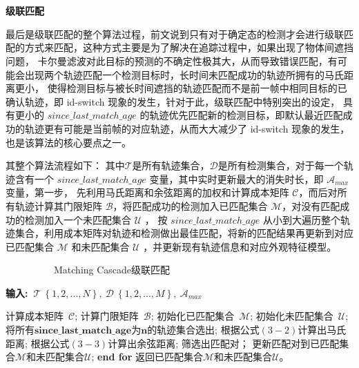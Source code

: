 \\ \hspace*{\fill} \\
\textbf{级联匹配}

最后是级联匹配的整个算法过程，前文说到只有对于确定态的检测才会进行级联匹配的方式来匹配，这种方式主要是为了解决在追踪过程中，如果出现了物体间遮挡问题，
卡尔曼滤波对此目标的预测的不确定性极其大，从而导致错误匹配，有可能会出现两个轨迹匹配一个检测目标时，长时间未匹配成功的轨迹所拥有的马氏距离更小，
使得检测目标与被长时间遮挡的轨迹匹配而不是前一帧中相同目标的已确认轨迹，即 id-switch 现象的发生，针对于此，级联匹配中特别突出的设定，
具有更小的 $since\_last\_match\_age$ 的轨迹优先匹配新的检测目标，即默认最近匹配成功的轨迹更有可能是当前帧的对应轨迹，从而大大减少了 id-switch 现象的发生，也是该算法的核心要点之一。

其整个算法流程如下：
其中$\mathcal{T}$是所有轨迹集合，$\mathcal{D}$是所有检测集合，对于每一个轨迹含有一个 $since\_last\_match\_age$ 变量，其中实时更新最大的消失时长，即 $\mathcal{A}_{max}$ 变量，第一步，
先利用马氏距离和余弦距离的加权和计算成本矩阵 $\mathcal{C}$，而后对所有轨迹计算其门限矩阵 $\mathcal{B}$，将匹配成功的检测加入已匹配集合 $\mathcal{M}$，对没有匹配成功的检测加入一个未匹配集合 $\mathcal{U}$ ，
按 $since\_last\_match\_age$ 从小到大遍历整个轨迹集合，利用成本矩阵对轨迹和检测做出最佳匹配，将新的匹配结果再更新到对应已匹配集合 $\mathcal{M}$ 和未匹配集合 $\mathcal{U}$ ，并更新现有轨迹信息和对应外观特征模型。

\begin{algorithm}[htpb]
	\caption{\ \ \ \ \ \ \ \ \ \ Matching Cascade级联匹配}
	\fangsong
	\hspace*{0.02in} {\bf 输入:\ $\mathcal{T}\ \left\{1, 2, ..., N \right\},\ \mathcal{D}\ \left\{1, 2, ..., M \right\},\  \mathcal{A}_{max}$} 
	\begin{algorithmic}[1]
		\State 计算成本矩阵\  {\bf $\mathcal{C}$};
		\State 计算门限矩阵\  {\bf $\mathcal{B}$};
		\State 初始化已匹配集合\  {\bf $\mathcal{M}$};
		\State 初始化未匹配集合\  {\bf $\mathcal{U}$};
		\State 将所有$\bm{since\_last\_match\_age}$为$\bm{n}$的轨迹集合选出;
		\State 根据公式$\left(3 - 2\right)$计算出马氏距离;
		\State 根据公式$\left(3 - 3\right)$计算出余弦距离;
		\State 筛选出匹配对；
		\State 更新匹配对到已匹配集合$\mathcal{M}$和未匹配集合$\mathcal{U}$;
		\EndFor
		\State \textbf{end for}
		\State 返回已匹配集合$\mathcal{M}$和未匹配集合$\mathcal{U}$。
	\end{algorithmic}
	\label{algo1}
\end{algorithm}


